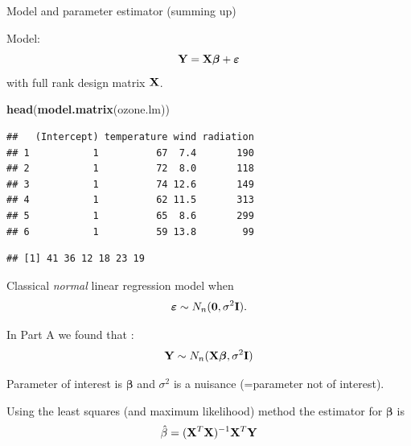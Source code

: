 \documentclass[10pt,ignorenonframetext,]{beamer}
\newenvironment{Shaded}{\begin{snugshade}}{\end{snugshade}}
\newcommand{\KeywordTok}[1]{\textcolor[rgb]{0.13,0.29,0.53}{\textbf{#1}}}
\newcommand{\OperatorTok}[1]{\textcolor[rgb]{0.81,0.36,0.00}{\textbf{#1}}}
\newcommand{\NormalTok}[1]{#1}
\begin{document}
\begin{frame}[fragile]

\begin{block}{Model and parameter estimator (summing up)}

Model: \[{\bf Y}=\bf X \boldsymbol{\beta}+{\boldsymbol{\varepsilon}}\]
with full rank design matrix \({\bf X}\).

\small

\begin{Shaded}
\begin{Highlighting}[]
\KeywordTok{head}\NormalTok{(}\KeywordTok{model.matrix}\NormalTok{(ozone.lm))}
\end{Highlighting}
\end{Shaded}

\begin{verbatim}
##   (Intercept) temperature wind radiation
## 1           1          67  7.4       190
## 2           1          72  8.0       118
## 3           1          74 12.6       149
## 4           1          62 11.5       313
## 5           1          65  8.6       299
## 6           1          59 13.8        99
\end{verbatim}

\begin{Shaded}
\end{Shaded}

\begin{verbatim}
## [1] 41 36 12 18 23 19
\end{verbatim}

\normalsize

\end{block}

\end{frame}

\begin{frame}

Classical \emph{normal} linear regression model when
\[\boldsymbol{\varepsilon}\sim N_n({\bf 0},\sigma^2{\bf I}).\]

In Part A we found that :
\[ {\bf Y} \sim N_{n}({\bf X} {\boldsymbol\beta},\sigma^2 {\bf I})\]

Parameter of interest is \(\boldsymbol{\beta}\) and \(\sigma^2\) is a
nuisance (=parameter not of interest).

Using the least squares (and maximum likelihood) method the estimator
for \(\boldsymbol\beta\) is
\[ \hat\beta=({\bf X}^T{\bf X})^{-1} {\bf X}^T {\bf Y}\]

\end{frame}
\end{document}
